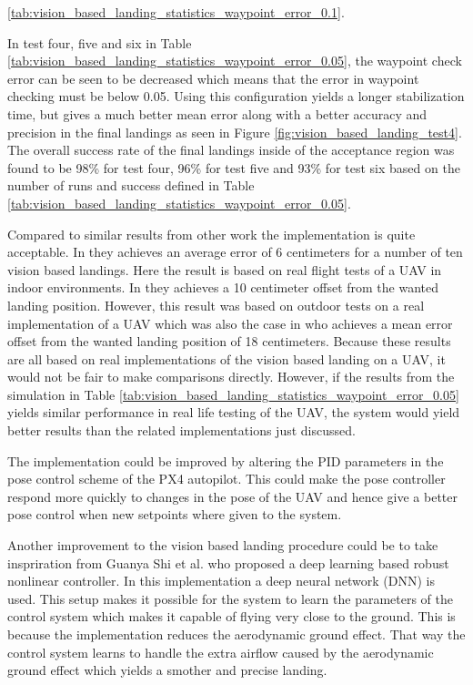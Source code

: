 \documentclass[../Head/report.tex]{subfiles}
\begin{document}
\ref{tab:vision_based_landing_statistics_waypoint_error_0.1}. 

In test four, five and six in Table \ref{tab:vision_based_landing_statistics_waypoint_error_0.05}, the waypoint check error can be seen to be decreased which means that the error in waypoint checking must be below 0.05. Using this configuration yields a longer stabilization time, but gives a much better mean error along with a better accuracy and precision in the final landings as seen in Figure \ref{fig:vision_based_landing_test4}. The overall success rate of the final landings inside of the acceptance region was found to be 98\% for test four, 96\% for test five and 93\% for test six based on the number of runs and success defined in Table \ref{tab:vision_based_landing_statistics_waypoint_error_0.05}. 

Compared to similar results from other work the implementation is quite acceptable. In \cite[p.~5]{AutomaticnavigationandlandingofanindoorAR} they achieves an average error of 6 centimeters for a number of ten vision based landings. Here the result is based on real flight tests of a UAV in indoor environments. In \cite[p.~56]{AutonomousRechargingSystemforDronesTwo} they achieves a 10 centimeter offset from the wanted landing position. However, this result was based on outdoor tests on a real implementation of a UAV which was also the case in \cite[p.~6]{AVisionBasedSystemForAutonomousVerticaLanding} who achieves a mean error offset from the wanted landing position of 18 centimeters. Because these results are all based on real implementations of the vision based landing on a UAV, it would not be fair to make comparisons directly. However, if the results from the simulation in Table \ref{tab:vision_based_landing_statistics_waypoint_error_0.05} yields similar performance in real life testing of the UAV, the system would yield better results than the related implementations just discussed. 

The implementation could be improved by altering the PID parameters in the pose control scheme of the PX4 autopilot. This could make the pose controller respond more quickly to changes in the pose of the UAV and hence give a better pose control when new setpoints where given to the system.    

Another improvement to the vision based landing procedure could be to take inspriration from Guanya Shi et al. \cite{NeuralLander} who proposed a deep
learning based robust nonlinear controller. In this implementation a deep neural network (DNN) is used. This setup makes it possible for the system to learn the parameters of the control system which makes it capable of flying very close to the ground. This is because the implementation reduces the aerodynamic ground effect. That way the control system learns to handle the extra airflow caused by the aerodynamic ground effect which yields a smother and precise landing.  
\end{document}
